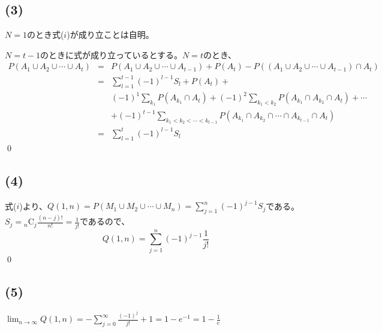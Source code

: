 \documentclass[]{jsarticle}
\begin{document}
    \subsection*{(3)}
        $N = 1$のとき式($i$)が成り立ことは自明。

        $N = t - 1$のときに式が成り立っているとする。$N = t$のとき、
        \begin{eqnarray}
            P(A_1\cup A_2\cup\cdots\cup A_t)
            &=& P(A_1\cup A_2\cup\cdots\cup A_{t - 1}) + P(A_t) - P((A_1\cup A_2\cup\cdots\cup A_{t - 1}) \cap A_t) \nonumber \\
            &=& \sum^{t - 1}_{l = 1}(-1)^{l - 1}S_l + P(A_t) + \nonumber \\
            && (-1)^1\sum_{k_1}P(A_{k_1}\cap A_t) + (-1)^2\sum_{k_1 < k_2}P(A_{k_1}\cap A_{k_2}\cap A_t) + \cdots \nonumber \\
            && + (-1)^{t - 1}\sum_{k_1 < k_2 < \cdots < k_{t - 1}}P(A_{k_1}\cap A_{k_2}\cap\cdots\cap A_{k_{t - 1}} \cap A_t) \nonumber \\
            &=& \sum^{t}_{l = 1}(-1)^{l - 1}S_l \nonumber
        \end{eqnarray}
        \qed
    \subsection*{(4)}
        式($i$)より、$\displaystyle Q(1, n) = P(M_1\cup M_2\cup\cdots\cup M_n) = \sum^{n}_{j = 1}(-1)^{j - 1}S_j$である。
        $\displaystyle S_j = {}_n\mathrm C_j\frac{(n - j)!}{n!} = \frac{1}{j!}$であるので、
        \begin{equation*}
            Q(1, n)= \sum^{n}_{j = 1}(-1)^{j - 1}\frac{1}{j!}
        \end{equation*}
        \qed
    \subsection*{(5)}
        $\displaystyle\lim_{n\rightarrow\infty}Q(1, n) = -\sum^\infty_{j = 0}\frac{(-1)^j}{j!} + 1 = 1 - e^{-1} = 1 - \frac{1}{e}$
\end{document}
